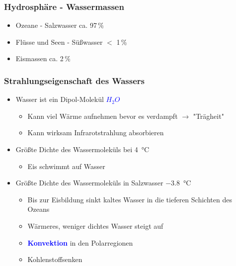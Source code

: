 \begin{frame}
	\frametitle{Hydrosphäre - Wassermassen}
	\begin{itemize}
		\item Ozeane - Salzwasser ca. 97\,\%
		\item Flüsse und Seen - Süßwasser $<$ 1\,\%
		\item Eismassen ca. 2\,\% %
	\end{itemize}
\end{frame}


\begin{frame}
	\frametitle{Strahlungseigenschaft des Wassers} %
	\begin{itemize}
		\item Wasser ist ein Dipol-Molekül \textcolor{blue}{$H_2O$}
		\begin{itemize}			
			\item<2->[$\rightarrow$] Kann viel Wärme aufnehmen bevor es verdampft $\rightarrow$ "Trägheit"
			\item<2->[$\rightarrow$] Kann wirksam Infrarotstrahlung absorbieren
		\end{itemize}
		
		\item<3-> Größte Dichte des Wassermoleküls bei \SI{4}{\degreeCelsius}
		\begin{itemize}
			\item<4->[$\rightarrow$] Eis schwimmt auf Wasser
		\end{itemize}		
		\item<5->Größte Dichte des Wassermoleküls in Salzwasser \SI{-3,8}{\degreeCelsius}
		\begin{itemize}
			\item<6->[$\rightarrow$] Bis zur Eisbildung sinkt kaltes Wasser in die tieferen Schichten des Ozeans
			\item<6-> [$\rightarrow$] Wärmeres, weniger dichtes Wasser steigt auf
			\item<6-> [] \textbf{\textcolor{blue}{Konvektion}} in den Polarregionen 
			\item<6-> [$\rightarrow$] Kohlenstoffsenken
		\end{itemize}
	\end{itemize}


\end{frame}

